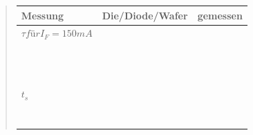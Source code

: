 \begin{quote}
       \begin{table}[h]
    	   \begin{addmargin}[-1cm]{3cm}
    	         \centering
                      \begin{tabular}{|p{3cm}|p{3cm}|p{10.2cm}|}
         \hline
         Messung                 & Die/Diode/Wafer & gemessen\\ 
         \hline
         $\tau für I_{F}=150 mA$ &        & \\
                                 &           &                  \\ 
                                 &           &                  \\
                                 &           &                  \\ 
                                 &           &                  \\
                                 &           &                  \\ 
                                 &           &                  \\
                                 &           &                  \\ 
                                 &           &                  \\
                                 &           &                  \\ 
                                 &           &                  \\
                                 &           &                  \\ 
                                 &           &                  \\
         \hline
         $t_{s}$                 &           & \\ 
                                 &           &                  \\ 
                                 &           &                  \\
                                 &           &                  \\ 
                                 &           &                  \\
                                 &           &                  \\ 
                                 &           &                  \\
                                 &           &                  \\ 

\end{tabular}
\end{addmargin}
\end{table}
\end{quote}
